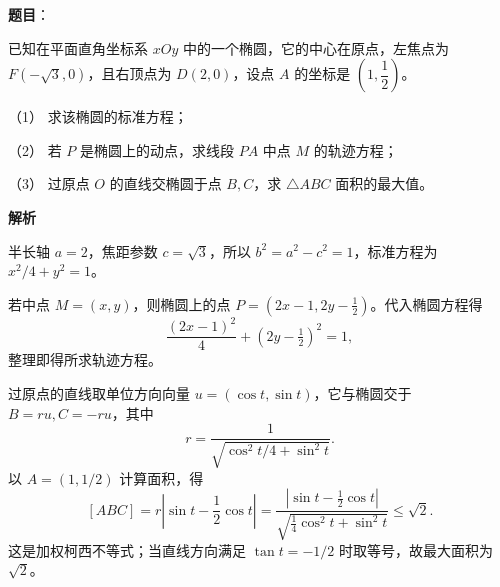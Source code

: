 \begin{answer}

\textbf{题目}：

已知在平面直角坐标系 $xOy$ 中的一个椭圆，它的中心在原点，左焦点为 $F(-\sqrt3,0)$，且右顶点为 $D(2,0)$，设点 $A$ 的坐标是 $\left(1,\dfrac12\right)$。

（1） 求该椭圆的标准方程；

（2） 若 $P$ 是椭圆上的动点，求线段 $PA$ 中点 $M$ 的轨迹方程；

（3） 过原点 $O$ 的直线交椭圆于点 $B,C$，求 $\triangle ABC$ 面积的最大值。

\textbf{解析}


半长轴 $a=2$，焦距参数 $c=\sqrt3$，所以 $b^2=a^2-c^2=1$，标准方程为 $x^2/4+y^2=1$。


若中点 $M=(x,y)$，则椭圆上的点 $P=(2x-1,2y-\tfrac12)$。代入椭圆方程得
\nopagebreak[4]
\[
\frac{(2x-1)^2}{4}+(2y-\tfrac12)^2=1,
\]
整理即得所求轨迹方程。


过原点的直线取单位方向向量 $u=(\cos t,\sin t)$，它与椭圆交于 $B=ru,C=-ru$，其中
\nopagebreak[4]
\[
r=\frac1{\sqrt{\cos^2t/4+\sin^2t}}.
\]
以 $A=(1,1/2)$ 计算面积，得
\nopagebreak[4]
\[
[ABC]=r\left|\sin t-\frac12\cos t\right|
=\frac{|\sin t-\tfrac12\cos t|}{\sqrt{\tfrac14\cos^2t+\sin^2t}}\le\sqrt2.
\]
这是加权柯西不等式；当直线方向满足 $\tan t=-1/2$ 时取等号，故最大面积为 $\sqrt2$。




\end{answer}
